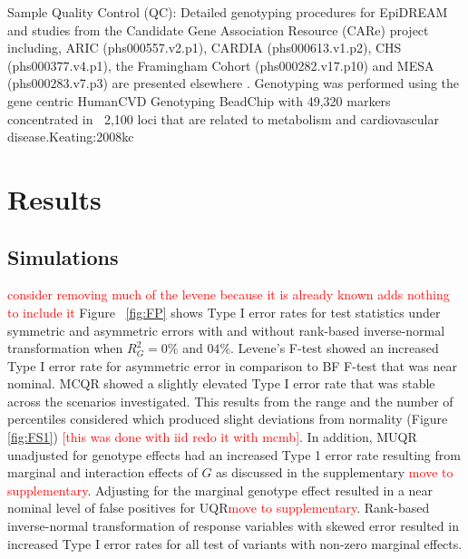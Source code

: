 \documentclass[12pt]{article}
\begin{document}
Sample Quality Control (QC): Detailed genotyping procedures for EpiDREAM and studies from the Candidate Gene Association Resource (CARe) project including, ARIC (phs000557.v2.p1), CARDIA (phs000613.v1.p2), CHS (phs000377.v4.p1), the Framingham Cohort (phs000282.v17.p10) and MESA (phs000283.v7.p3) are presented elsewhere \cite{anand2012glucose, musunuru2010candidate}. Genotyping was performed using the gene centric HumanCVD Genotyping BeadChip with 49,320 markers concentrated in $~$ 2,100 loci that are related to metabolism and cardiovascular disease.{Keating:2008kc}




\section{Results}
\subsection{Simulations} \textcolor{red}{consider removing much of the levene because it is already known adds nothing to include it}
Figure ~\ref{fig:FP} shows Type I error rates for test statistics under symmetric and asymmetric errors with and without rank-based inverse-normal transformation when $R^{2}_G= 0\%$ and $04\%$. Levene's F-test showed an increased Type I error rate for asymmetric error in comparison to BF F-test that was near nominal. MCQR showed a slightly elevated Type I error rate that was stable across the scenarios investigated. This results from the range and the number of percentiles considered which produced slight deviations from normality (Figure \ref{fig:FS1}) \textcolor{red}{[this was done with iid redo it with mcmb]}. In addition, MUQR unadjusted for genotype effects had an increased Type 1 error rate resulting from marginal and interaction effects of $G$ as discussed in the supplementary \textcolor{red}{move to supplementary}. Adjusting for the marginal genotype effect resulted in a near nominal level of false positives for UQR\textcolor{red}{move to supplementary}. Rank-based inverse-normal transformation of response variables with skewed error resulted in increased Type I error rates for all test of variants with non-zero marginal effects. 
\end{document}
